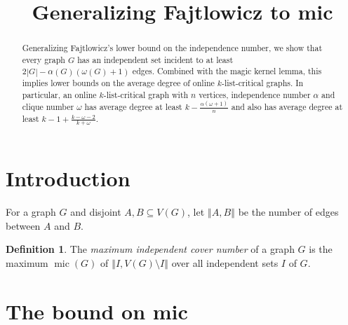 \documentclass[12pt]{article}
\title{Generalizing Fajtlowicz to mic}
\theoremstyle{plain}
\theoremstyle{definition}
\newtheorem{defn}{Definition}
\theoremstyle{remark}
\newcommand{\size}[1]{\left\Vert#1\right\Vert}
\newcommand{\mic}{\operatorname{mic}}
\begin{document}
\maketitle
\begin{abstract}
Generalizing Fajtlowicz's lower bound on the independence number, we show that every graph $G$ has an independent set incident to at least $2|G| - \alpha(G)(\omega(G) + 1)$ edges.  
Combined with the magic kernel lemma, this implies lower bounds on the average degree of online $k$-list-critical graphs.  In particular,  an online $k$-list-critical graph with $n$ vertices, independence number $\alpha$ and clique number $\omega$ has average degree at least $k - \frac{\alpha(\omega+1)}{n}$ and also has average degree at least $k-1 + \frac{k - \omega - 2}{k + \omega}$. 
\end{abstract}

\section{Introduction}
For a graph $G$ and disjoint $A, B \subseteq V(G)$, let $\size{A,B}$ be the number of edges between $A$ and $B$.

\begin{defn} The \emph{maximum independent cover number }of a graph $G$
	is the maximum $\mic(G)$ of $\size{I, V(G) \setminus I}$ over all independent sets $I$
	of $G$. 
\end{defn}

\section{The bound on mic}
\end{document}
